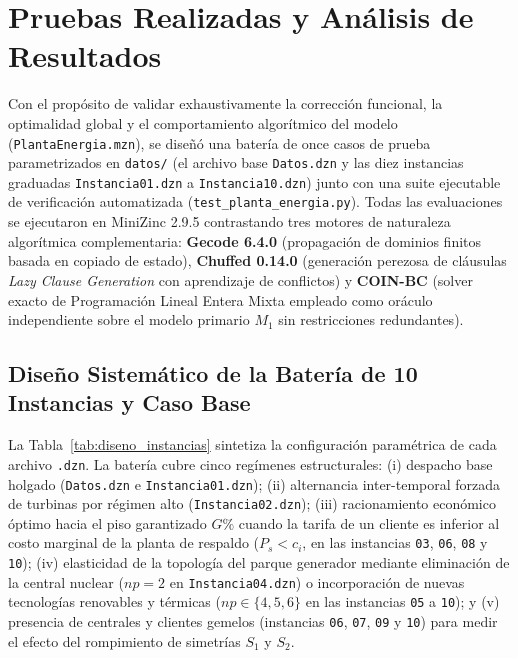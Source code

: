 \section{Pruebas Realizadas y Análisis de Resultados}
\label{sec:pruebas}

Con el propósito de validar exhaustivamente la corrección funcional, la optimalidad global y el comportamiento algorítmico del modelo (\texttt{PlantaEnergia.mzn}), se diseñó una batería de once casos de prueba parametrizados en \texttt{datos/} (el archivo base \texttt{Datos.dzn} y las diez instancias graduadas \texttt{Instancia01.dzn} a \texttt{Instancia10.dzn}) junto con una suite ejecutable de verificación automatizada (\texttt{test\_planta\_energia.py}). Todas las evaluaciones se ejecutaron en MiniZinc 2.9.5 contrastando tres motores de naturaleza algorítmica complementaria: \textbf{Gecode 6.4.0} (propagación de dominios finitos basada en copiado de estado), \textbf{Chuffed 0.14.0} (generación perezosa de cláusulas \emph{Lazy Clause Generation} con aprendizaje de conflictos) y \textbf{COIN-BC} (solver exacto de Programación Lineal Entera Mixta empleado como oráculo independiente sobre el modelo primario $M_1$ sin restricciones redundantes).

\subsection{Diseño Sistemático de la Batería de 10 Instancias y Caso Base}

La Tabla~\ref{tab:diseno_instancias} sintetiza la configuración paramétrica de cada archivo \texttt{.dzn}. La batería cubre cinco regímenes estructurales: (i) despacho base holgado (\texttt{Datos.dzn} e \texttt{Instancia01.dzn}); (ii) alternancia inter-temporal forzada de turbinas por régimen alto (\texttt{Instancia02.dzn}); (iii) racionamiento económico óptimo hacia el piso garantizado $G\%$ cuando la tarifa de un cliente es inferior al costo marginal de la planta de respaldo ($P_s < c_i$, en las instancias \texttt{03}, \texttt{06}, \texttt{08} y \texttt{10}); (iv) elasticidad de la topología del parque generador mediante eliminación de la central nuclear ($np = 2$ en \texttt{Instancia04.dzn}) o incorporación de nuevas tecnologías renovables y térmicas ($np \in \{4, 5, 6\}$ en las instancias \texttt{05} a \texttt{10}); y (v) presencia de centrales y clientes gemelos (instancias \texttt{06}, \texttt{07}, \texttt{09} y \texttt{10}) para medir el efecto del rompimiento de simetrías $S_1$ y $S_2$.

